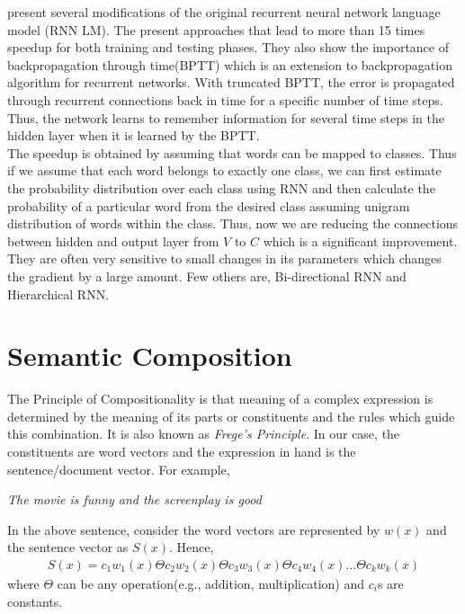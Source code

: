 \cite{Mikolov:11} present several modifications of the original recurrent neural network language model (RNN LM). The present approaches that lead to more than 15 times speedup for both training and testing phases. They also show the importance of backpropagation through time(BPTT) which is an extension to backpropagation algorithm for recurrent networks. With truncated BPTT, the error is propagated through recurrent connections back in time for a specific number of time steps. Thus, the network learns to remember information for several time steps in the hidden layer when it is learned by the BPTT.\\
The speedup is obtained by assuming that words can be mapped to classes. Thus if we assume that each word belongs to exactly one class, we can first estimate the probability distribution over each class using RNN and then calculate the probability of a particular word from the desired class assuming unigram distribution of words within the class. Thus, now we are reducing the connections between hidden and output layer from $V$ to $C$ which is a significant improvement.\\
They are often very sensitive to small changes in its parameters which changes the gradient by a large amount. Few others are, Bi-directional RNN and Hierarchical RNN.\\

\section{Semantic Composition}
\label{sec:composition}
The Principle of Compositionality is that meaning of a complex expression is determined by the meaning of its parts or constituents and the rules which guide this combination. It is also known as \emph{Frege's Principle}. In our case, the constituents are word vectors and the expression in hand is the sentence/document vector. For example,
\begin{center}
\emph{The movie is funny and the screenplay is good}
\end{center}
In the above sentence, consider the word vectors are represented by $w(x)$ and the sentence vector as $S(x)$. Hence,
\begin{align}
S(x) = c_1w_1(x) \Theta c_2w_2(x) \Theta c_3w_3(x) \Theta c_4w_4(x) \dots \Theta c_kw_k(x)
\end{align}
where $\Theta$ can be any operation(e.g., addition, multiplication) and $c_i$s are constants.

